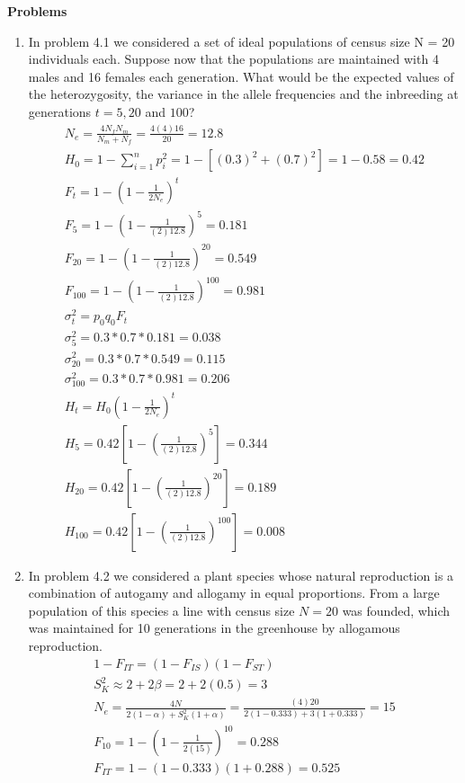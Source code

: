 \documentclass[12pt]{amsart}
\begin{document}
{\large \bf Problems}   
\begin{enumerate}
\item In problem 4.1 we considered a set of ideal populations of census size N = 20 individuals each. Suppose now that the populations are maintained with 4 males and 16 females each generation. What would be the expected values of the heterozygosity, the variance in the allele frequencies and the inbreeding at generations $t = 5, 20$ and $100$?
\begin{gather*}
N_e = \frac{4N_fN_m}{N_m + N_f} = \frac{4(4)16}{20} = 12.8\\
H_0 = 1 - \sum_{i=1}^np_i^2 = 1 - [(0.3)^2 + (0.7)^2] = 1 - 0.58 = 0.42 \\
F_t = 1 - (1 - \frac{1}{2N_e})^t \\
F_5 = 1 - (1 - \frac{1}{(2)12.8}) ^ 5 =  0.181\\
F_{20} = 1 - (1 - \frac{1}{(2)12.8}) ^ {20} = 0.549\\  
F_{100} = 1 - (1 - \frac{1}{(2)12.8}) ^ {100} = 0.981\\
\sigma _t^2 = p_0q_0F_t \\
\sigma_5^2 = 0.3 * 0.7 * 0.181  = 0.038\\
\sigma_{20}^2 = 0.3 * 0.7 * 0.549 = 0.115\\
\sigma_{100}^2 = 0.3 * 0.7 * 0.981 = 0.206\\
H_t = H_0(1 - \frac{1}{2N_e})^t \\
H_5 = 0.42[1 - (\frac{1}{(2)12.8})^5] = 0.344\\
H_{20} = 0.42[1 - (\frac{1}{(2)12.8})^{20}] = 0.189\\
H_{100} = 0.42[1 - (\frac{1}{(2)12.8})^{100}] = 0.008
\end{gather*}

\item In problem 4.2 we considered a plant species whose natural reproduction is a combination of autogamy and allogamy in equal proportions. From a large population of this species a line with census size $N = 20$ was founded, which was maintained for 10 generations in the greenhouse by allogamous reproduction. 
\begin{gather*}
1 - F_{IT} = (1-F_{IS})(1-F_{ST}) \\
S_K^2 \approx 2 + 2\beta = 2 + 2(0.5) = 3\\ 
N_e = \frac{4N}{2(1-\alpha) + S_K^2(1+\alpha)} = \frac{(4)20}{2(1-0.333) + 3(1+0.333)} = 15\\
F_{10} = 1 - (1-\frac{1}{2(15)})^10 = 0.288 \\
F_{IT} = 1 - (1-0.333)(1+0.288) = 0.525
\end{gather*}


\end{enumerate}
\end{document}
